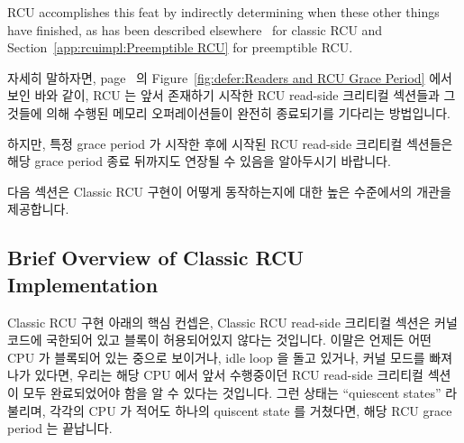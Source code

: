 RCU accomplishes this feat by indirectly determining when these
other things have finished, as has been described
elsewhere~\cite{McKenney98}
for classic RCU and
Section~\ref{app:rcuimpl:Preemptible RCU} for preemptible RCU.
\fi

자세히 말하자면,
page~\pageref{fig:defer:Readers and RCU Grace Period} 의
Figure~\ref{fig:defer:Readers and RCU Grace Period} 에서 보인 바와 같이, RCU 는
앞서 존재하기 시작한 RCU read-side 크리티컬 섹션들과 그것들에 의해 수행된
메모리 오퍼레이션들이 완전히 종료되기를 기다리는 방법입니다.

하지만, 특정 grace period 가 시작한 후에 시작된 RCU read-side 크리티컬 섹션들은
해당 grace period 종료 뒤까지도 연장될 수 있음을 알아두시기 바랍니다.

다음 섹션은 Classic RCU 구현이 어떻게 동작하는지에 대한 높은 수준에서의 개관을
제공합니다.
\iffalse

In particular, as shown in the
Figure~\ref{fig:defer:Readers and RCU Grace Period} on
page~\pageref{fig:defer:Readers and RCU Grace Period},
RCU is a way of
waiting for pre-existing RCU read-side critical sections to completely
finish, also including the memory operations executed
by those critical sections.

However, note that RCU read-side critical sections
that begin after the beginning
of a given grace period can and will extend beyond the end of that grace
period.

The following section gives a very high-level view of how
the Classic RCU implementation operates.
\fi

\subsection{Brief Overview of Classic RCU Implementation}
\label{app:rcuimpl:rcutree:Brief Overview of Classic RCU Implementation}

Classic RCU 구현 아래의 핵심 컨셉은, Classic RCU read-side 크리티컬 섹션은 커널
코드에 국한되어 있고 블록이 허용되어있지 않다는 것입니다.
이말은 언제든 어떤 CPU 가 블록되어 있는 중으로 보이거나, idle loop 을 돌고
있거나, 커널 모드를 빠져나가 있다면, 우리는 해당 CPU 에서 앞서 수행중이던 RCU
read-side 크리티컬 섹션이 모두 완료되었어야 함을 알 수 있다는 것입니다.
그런 상태는 ``quiescent states'' 라 불리며, 각각의 CPU 가 적어도 하나의
quiscent state 를 거쳤다면, 해당 RCU grace period 는 끝납니다.
\iffalse

The key concept behind the Classic RCU implementation is that
Classic RCU read-side critical sections are confined to kernel
code and are not permitted to block.
This means that any time a given CPU is seen
either blocking, in the idle loop, or exiting the kernel, we know that all
RCU read-side critical sections that were previously running on
that CPU must have completed.
Such states are called ``quiescent states'', and
after each CPU has passed through at least one quiescent state,
the RCU grace period ends.
\fi


